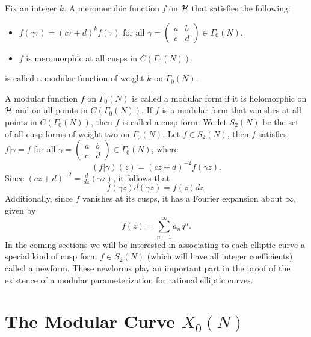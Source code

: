 \begin{definition}
Fix an integer $k$. A meromorphic function $f$ on $\mathcal{H}$ that satisfies the following:
\begin{itemize}
\item{} $f(\gamma\tau) = (c\tau+d)^{k}f(\tau) \text{ for all } \gamma = \begin{pmatrix} a & b \\  c & d \end{pmatrix} \in \Gamma_0(N),$
\item{} $f$ is meromorphic at all cusps in $C(\Gamma_0(N))$,
\end{itemize}
is called a modular function of weight $k$ on $\Gamma_0(N).$
\end{definition}
A modular function $f$ on $\Gamma_0(N)$ is called a modular form if it is holomorphic on $\mathcal{H}$ and on all points in $C(\Gamma_0(N))$. If $f$ is a modular form that vanishes at all points in $C(\Gamma_0(N))$, then $f$ is called a cusp form. We let $S_2(N)$ be the set of all cusp forms of weight two on $\Gamma_0(N)$. Let $f \in S_2(N)$, then $f$ satisfies $f|\gamma = f$ for all $\gamma =\begin{pmatrix} a & b \\  c & d \end{pmatrix} \in \Gamma_0(N)$, where
\begin{equation}\label{cuspform prop1}
\left(f|\gamma\right)(z) = (cz + d)^{-2}f(\gamma z).
\end{equation}
Since $(cz + d)^{-2} = \frac{d}{dz}(\gamma z)$, it follows that
$$f(\gamma z)d(\gamma z) = f(z)dz.$$
Additionally, since $f$ vanishes at its cusps, it has a Fourier expansion about $\infty$, given by
$$f(z) = \sum_{n=1}^\infty a_nq^n.$$ 
In the coming sections we will be interested in associating to each elliptic curve a special kind of cusp form $f \in S_2(N)$ (which will have all integer coefficients) called a newform. These newforms play an important part in the proof of the existence of a modular parameterization for rational elliptic curves.


\section{The Modular Curve $X_0(N)$}

